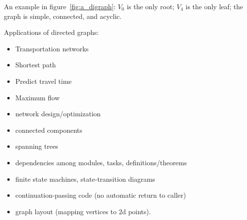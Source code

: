\documentclass[11pt,openany]{book}
\begin{document}
An example in figure~\ref{fig:a_digraph}:
$V_0$ is the only root; $V_4$ is the only leaf;
the graph is simple, connected, and acyclic.

Applications of directed graphs:~\cite{clrs_2009}
\begin{itemize}
  \item Transportation networks
  \item Shortest path
  \item Predict travel time
  \item Maximum flow
  \item network design/optimization
  \item connected components
  \item spanning trees
  \item dependencies among modules, tasks, definitions/theorems
  \item finite state machines, state-transition diagrams
  \item continuation-passing code (no automatic return to caller)
  \item graph layout (mapping vertices to $2$d points).
\end{itemize}

\label{sec:Category_from_digraph}

\end{document}
